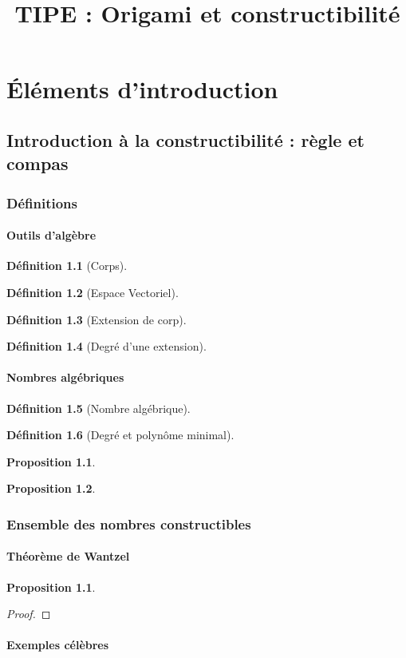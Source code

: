 \documentclass[a4paper,12pt,french]{report}
\title{TIPE : Origami et constructibilité}
\newtheorem{proposition}{Proposition}[part]
\newtheorem{theorem}{Proposition}[part]
\newtheorem{proof}{Démonstration}[part]
\newtheorem{definition}{Définition}[part]
\begin{document}
\maketitle
\renewcommand{\contentsname}{Sommaire}
\tableofcontents{}

\part{Éléments d'introduction}
\chapter{Introduction à la constructibilité : règle et compas}
	
	\section{Définitions}
		\subsection{Outils d'algèbre}
			\begin{definition}[Corps]
			\end{definition}
			\begin{definition}[Espace Vectoriel]
			\end{definition}
			\begin{definition}[Extension de corp]
			\end{definition}
			\begin{definition}[Degré d'une extension]
			\end{definition}
			
		\subsection{Nombres algébriques}
			\begin{definition}[Nombre algébrique]
			\end{definition}
			\begin{definition}[Degré et polynôme minimal]
			\end{definition}
			\begin{proposition}
			\end{proposition}
			\begin{proposition}
			\end{proposition}
		
	\section{Ensemble des nombres constructibles}
		\subsection{Théorème de Wantzel}
			\begin{theorem}
				
			\end{theorem}
			\begin{proof}
				
			\end{proof}
		
		\subsection{Exemples célèbres}
\end{document}
